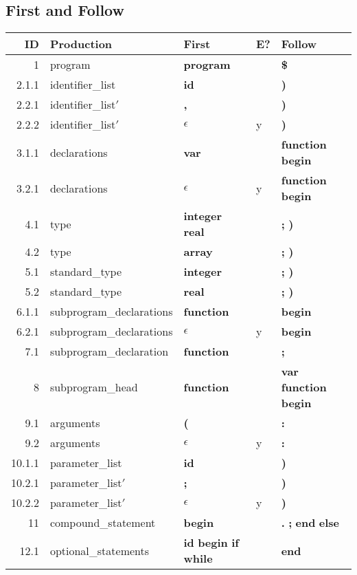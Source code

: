\subsection*{First and Follow}
\begin{center}
\begin{tabular}{rllll}
ID & Production & First & E? & Follow\\
\hline
1 & program & \textbf{program} &  & \textbf{\$}\\
2.1.1 & identifier\_list & \textbf{id} &  & \textbf{)}\\
2.2.1 & identifier\_list$\prime$ & \textbf{,} &  & \textbf{)}\\
2.2.2 & identifier\_list$\prime$ & $\epsilon$ & y & \textbf{)}\\
3.1.1 & declarations & \textbf{var} &  & \textbf{function} \textbf{begin}\\
3.2.1 & declarations & $\epsilon$ & y & \textbf{function} \textbf{begin}\\
4.1 & type & \textbf{integer real} &  & \textbf{;} \textbf{)}\\
4.2 & type & \textbf{array} &  & \textbf{;} \textbf{)}\\
5.1 & standard\_type & \textbf{integer} &  & \textbf{;} \textbf{)}\\
5.2 & standard\_type & \textbf{real} &  & \textbf{;} \textbf{)}\\
6.1.1 & subprogram\_declarations & \textbf{function} &  & \textbf{begin}\\
6.2.1 & subprogram\_declarations & $\epsilon$ & y & \textbf{begin}\\
7.1 & subprogram\_declaration & \textbf{function} &  & \textbf{;}\\
8 & subprogram\_head & \textbf{function} &  & \textbf{var} \textbf{function} \textbf{begin}\\
9.1 & arguments & \textbf{(} &  & \textbf{:}\\
9.2 & arguments & $\epsilon$ & y & \textbf{:}\\
10.1.1 & parameter\_list & \textbf{id} &  & \textbf{)}\\
10.2.1 & parameter\_list$\prime$ & \textbf{;} &  & \textbf{)}\\
10.2.2 & parameter\_list$\prime$ & $\epsilon$ & y & \textbf{)}\\
11 & compound\_statement & \textbf{begin} &  & \textbf{.} \textbf{;} \textbf{end} \textbf{else}\\
12.1 & optional\_statements & \textbf{id} \textbf{begin} \textbf{if} \textbf{while} &  & \textbf{end}\\

\end{tabular}
\end{center}
